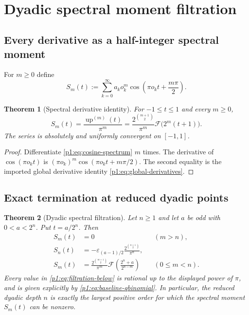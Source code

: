 \documentclass[11pt,oneside]{article}
\newtheorem{theorem}{Theorem}[section]
\theoremstyle{definition}
\theoremstyle{remark}
\newcommand{\Up}{\operatorname{up}}
\newcommand{\eps}{\varepsilon}
\newcommand{\GF}{\mathcal F}
\begin{document}
\section{Dyadic spectral moment filtration}\label{p1:sec:moment-filtration}

\subsection{Every derivative as a half-integer spectral moment}

For $m\ge0$ define
\begin{equation}\label{p1:eq:S-m-def}
 S_m(t):=\sum_{k=0}^{\infty}a_ko_k^m
 \cos\!\left(\pi o_kt+\frac{m\pi}{2}\right).
\end{equation}

\begin{theorem}[Spectral derivative identity]\label{p1:thm:spectral-derivative}
For $-1\le t\le1$ and every $m\ge0$,
\begin{equation}\label{p1:eq:spectral-derivative}
 \boxed{
 S_m(t)=\frac{\Up^{(m)}(t)}{\pi^m}
 =\frac{2^{\binom{m+1}{2}}}{\pi^m}
 \GF\bigl(2^m(t+1)\bigr).}
\end{equation}
The series is absolutely and uniformly convergent on $[-1,1]$.
\end{theorem}

\begin{proof}
Differentiate \eqref{p1:eq:cosine-spectrum} $m$ times.  The derivative of
$\cos(\pi o_kt)$ is
$(\pi o_k)^m\cos(\pi o_kt+m\pi/2)$.  The second equality is the imported
global derivative identity \eqref{p1:eq:global-derivatives}.
\end{proof}

\subsection{Exact termination at reduced dyadic points}

\begin{theorem}[Dyadic spectral filtration]\label{p1:thm:dyadic-filtration}
Let $n\ge1$ and let $a$ be odd with $0<a<2^n$.  Put $t=a/2^n$.  Then
\begin{align}
 S_m(t)&=0 &&(m>n),
 \label{p1:eq:filtration-above}\\
 S_n(t)&=-\eps_{(a-1)/2}
 \frac{2^{\binom{n+1}{2}}}{\pi^n},
 \label{p1:eq:filtration-critical}\\
 S_m(t)&=\frac{2^{\binom{m+1}{2}}}{\pi^m}
 \GF\!\left(\frac{2^n+a}{2^{n-m}}\right)
 &&(0\le m<n).
 \label{p1:eq:filtration-below}
\end{align}
Every value in \eqref{p1:eq:filtration-below} is rational up to the displayed
power of $\pi$, and is given explicitly by \eqref{p1:eq:baseline-qbinomial}.
In particular, the reduced dyadic depth $n$ is exactly the largest positive
order for which the spectral moment $S_m(t)$ can be nonzero.
\end{theorem}
\end{document}

